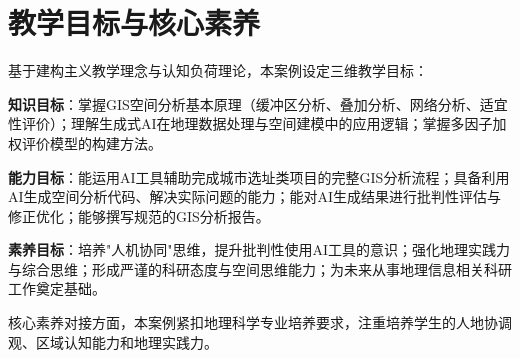 \section{教学目标与核心素养}

基于建构主义教学理念与认知负荷理论\citep{李家清2015}，本案例设定三维教学目标：

\textbf{知识目标}：掌握GIS空间分析基本原理（缓冲区分析、叠加分析、网络分析、适宜性评价）；理解生成式AI在地理数据处理与空间建模中的应用逻辑；掌握多因子加权评价模型的构建方法。

\textbf{能力目标}：能运用AI工具辅助完成城市选址类项目的完整GIS分析流程；具备利用AI生成空间分析代码、解决实际问题的能力；能对AI生成结果进行批判性评估与修正优化；能够撰写规范的GIS分析报告。

\textbf{素养目标}：培养"人机协同"思维，提升批判性使用AI工具的意识；强化地理实践力与综合思维；形成严谨的科研态度与空间思维能力；为未来从事地理信息相关科研工作奠定基础。

核心素养对接方面，本案例紧扣地理科学专业培养要求，注重培养学生的人地协调观、区域认知能力和地理实践力\citep{教育部2022}。